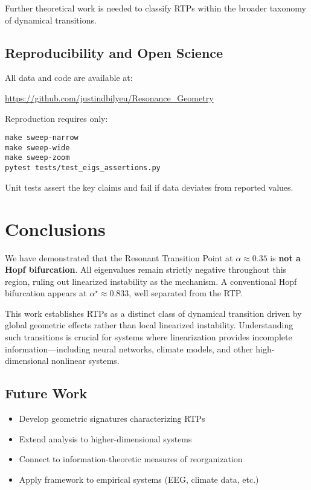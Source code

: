 \documentclass[11pt,twocolumn]{article}
\begin{document}
Further theoretical work is needed to classify RTPs within the broader taxonomy of dynamical transitions.

\subsection{Reproducibility and Open Science}

All data and code are available at:
\begin{center}
\url{https://github.com/justindbilyeu/Resonance_Geometry}
\end{center}

Reproduction requires only:
\begin{verbatim}
make sweep-narrow
make sweep-wide
make sweep-zoom
pytest tests/test_eigs_assertions.py
\end{verbatim}

Unit tests assert the key claims and fail if data deviates from reported values.

\section{Conclusions}

We have demonstrated that the Resonant Transition Point at $\alpha \approx 0.35$ is \textbf{not a Hopf
bifurcation}. All eigenvalues remain strictly negative throughout this region, ruling out linearized instability
as the mechanism. A conventional Hopf bifurcation appears at $\alpha^\star \approx 0.833$, well separated from
the RTP.

This work establishes RTPs as a distinct class of dynamical transition driven by global geometric effects rather
than local linearized instability. Understanding such transitions is crucial for systems where linearization
provides incomplete information—including neural networks, climate models, and other high-dimensional nonlinear
systems.

\subsection{Future Work}

\begin{itemize}
  \item Develop geometric signatures characterizing RTPs
  \item Extend analysis to higher-dimensional systems
  \item Connect to information-theoretic measures of reorganization
  \item Apply framework to empirical systems (EEG, climate data, etc.)
\end{itemize}
\end{document}
